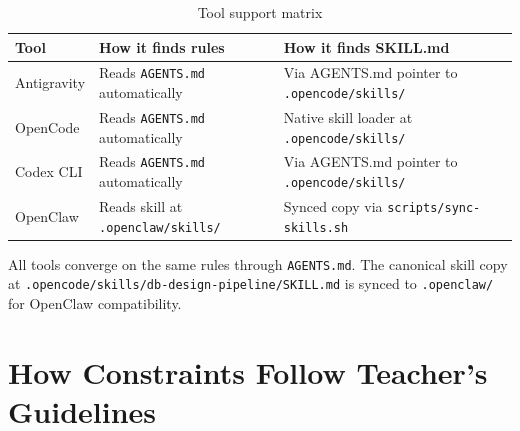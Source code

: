 \documentclass[12pt,a4paper]{article}
\begin{document}
\begin{table}[h]
\centering
\begin{tabular}{|l|p{3cm}|p{5cm}|}
\hline
\textbf{Tool} & \textbf{How it finds rules} & \textbf{How it finds SKILL.md} \\
\hline
Antigravity & Reads \texttt{AGENTS.md} automatically & Via AGENTS.md pointer to \texttt{.opencode/skills/} \\
\hline
OpenCode & Reads \texttt{AGENTS.md} automatically & Native skill loader at \texttt{.opencode/skills/} \\
\hline
Codex CLI & Reads \texttt{AGENTS.md} automatically & Via AGENTS.md pointer to \texttt{.opencode/skills/} \\
\hline
OpenClaw & Reads skill at \texttt{.openclaw/skills/} & Synced copy via \texttt{scripts/sync-skills.sh} \\
\hline
\end{tabular}
\caption{Tool support matrix}
\end{table}

All tools converge on the same rules through \texttt{AGENTS.md}. The canonical skill copy at \texttt{.opencode/skills/db-design-pipeline/SKILL.md} is synced to \texttt{.openclaw/} for OpenClaw compatibility.

\section{How Constraints Follow Teacher's Guidelines}
\end{document}
